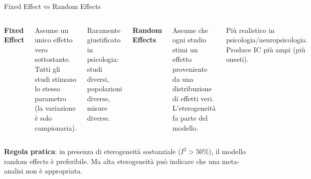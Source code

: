 \documentclass[
  ignorenonframetext,
]{beamer}
\begin{document}
\begin{frame}{Fixed Effect vs Random Effects}
\label{fixed-effect-vs-random-effects}
\begin{columns}
\textbf{Fixed Effect}
\vspace{0.3em}

\footnotesize Assume un unico effetto vero sottostante. Tutti gli studi stimano lo stesso parametro (la variazione è solo campionaria).

\vspace{0.3em}
Raramente giustificato in psicologia: studi diversi, popolazioni diverse, misure diverse.

\textbf{Random Effects}
\vspace{0.3em}

\footnotesize Assume che ogni studio stimi un effetto proveniente da una distribuzione di effetti veri. L'eterogeneità fa parte del modello.

\vspace{0.3em}
Più realistico in psicologia/neuropsicologia. Produce IC più ampi (più onesti).
\end{columns}

\vspace{0.5em}

\small \textbf{Regola pratica}: in presenza di eterogeneità sostanziale
(\(I^2 > 50\%\)), il modello random effects è preferibile. Ma alta
eterogeneità può indicare che una meta-analisi non è appropriata.
\end{frame}
\end{document}
